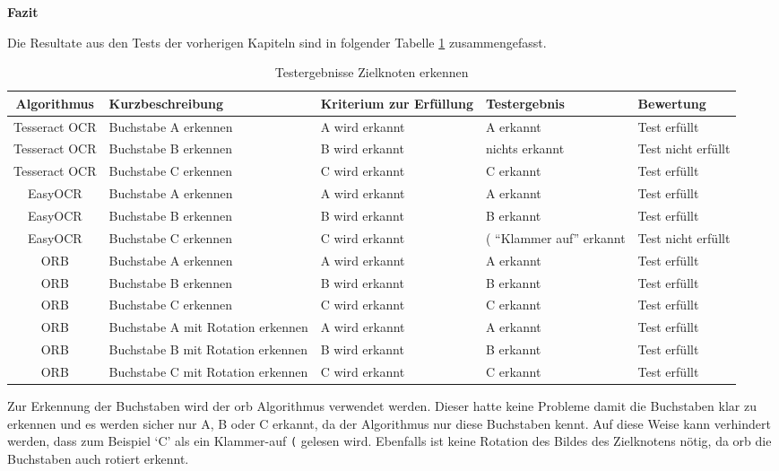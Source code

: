 \textbf{Fazit}

Die Resultate aus den Tests der vorherigen Kapiteln sind in folgender Tabelle \ref{tab:test-target-node} zusammengefasst.

\begin{table}[H]
\centering
\small
\begin{tabularx}{\textwidth}{|c|X|X|X|l|}
        \hline
        \textbf{Algorithmus} & \textbf{Kurzbeschreibung} & \textbf{Kriterium zur Erfüllung} & \textbf{Testergebnis} & \textbf{Bewertung} \\
        \hline
        Tesseract OCR & Buchstabe A erkennen & A wird erkannt & A erkannt & Test erfüllt \\ \hline
        Tesseract OCR & Buchstabe B erkennen & B wird erkannt & nichts erkannt & Test nicht erfüllt \\ \hline
        Tesseract OCR & Buchstabe C erkennen & C wird erkannt &  C erkannt & Test erfüllt \\ \hline 
        EasyOCR & Buchstabe A erkennen & A wird erkannt & A erkannt & Test erfüllt \\ \hline
        EasyOCR & Buchstabe B erkennen & B wird erkannt & B erkannt &  Test erfüllt \\ \hline
        EasyOCR & Buchstabe C erkennen & C wird erkannt & ( ``Klammer auf'' erkannt & Test nicht erfüllt \\ \hline
        ORB & Buchstabe A erkennen & A wird erkannt & A erkannt & Test erfüllt \\ \hline
        ORB & Buchstabe B erkennen & B wird erkannt & B erkannt & Test erfüllt \\ \hline
        ORB & Buchstabe C erkennen & C wird erkannt & C erkannt & Test erfüllt \\ \hline
        ORB & Buchstabe A mit Rotation erkennen & A wird erkannt & A erkannt & Test erfüllt \\ \hline
        ORB & Buchstabe B mit Rotation erkennen & B wird erkannt & B erkannt & Test erfüllt \\ \hline
        ORB & Buchstabe C mit Rotation erkennen & C wird erkannt & C erkannt & Test erfüllt \\ \hline

\end{tabularx}
    \caption{Testergebnisse Zielknoten erkennen}
\label{tab:test-target-node}
\end{table}

Zur Erkennung der Buchstaben wird der \acrshort{orb} Algorithmus verwendet werden. Dieser hatte keine Probleme damit die Buchstaben klar zu erkennen und es werden sicher nur A, B oder C erkannt, da der Algorithmus nur diese Buchstaben kennt. Auf diese Weise kann verhindert werden, dass zum Beispiel `C' als ein Klammer-auf \verb|(| gelesen wird. Ebenfalls ist keine Rotation des Bildes des Zielknotens nötig, da \gls{orb} die Buchstaben auch rotiert erkennt.


